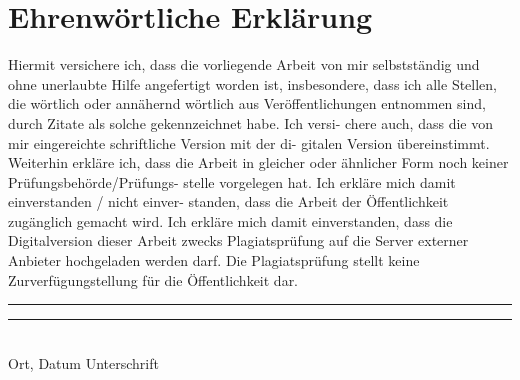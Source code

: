 
\section*{Ehrenwörtliche Erklärung}
Hiermit versichere ich, dass die vorliegende Arbeit von mir selbstständig und ohne unerlaubte Hilfe angefertigt worden ist, insbesondere, dass ich alle Stellen, die wörtlich oder annähernd wörtlich aus Veröffentlichungen entnommen sind, durch Zitate als solche gekennzeichnet habe. Ich versi- chere auch, dass die von mir eingereichte schriftliche Version mit der di- gitalen Version übereinstimmt. Weiterhin erkläre ich, dass die Arbeit in gleicher oder ähnlicher Form noch keiner Prüfungsbehörde/Prüfungs- stelle vorgelegen hat. Ich erkläre mich damit einverstanden / nicht einver- standen, dass die Arbeit der Öffentlichkeit zugänglich gemacht wird. Ich erkläre mich damit einverstanden, dass die Digitalversion dieser Arbeit zwecks Plagiatsprüfung auf die Server externer Anbieter hochgeladen werden darf. Die Plagiatsprüfung stellt keine Zurverfügungstellung für die Öffentlichkeit dar. 

\vspace{3cm}
\noindent\rule{6cm}{0.4pt} \hfill \rule{6cm}{0.4pt}\\ 
Ort, Datum \hspace{7.4cm} Unterschrift 
